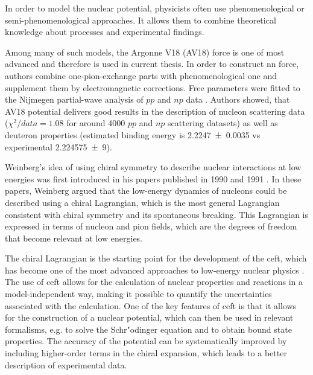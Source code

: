 In order to model the nuclear potential, physicists often use phenomenological
or semi-phenomenological approaches. It allows them to combine
theoretical knowledge about processes and experimental findings.

Among many of such models, the Argonne V18 (AV18) \cite{AV18Wiringa} force is one of most
advanced and therefore is used in current thesis.
In order to construct \gls{nn} force, authors combine
one-pion-exchange parts
with phenomenological one and supplement them by electromagnetic corrections.
Free parameters were fitted to
the Nijmegen partial-wave analysis of $pp$ and $np$ data \cite{NijmegenPhysRevC.48.792}. 
Authors showed, that AV18 potential delivers good results
in the description of nucleon scattering data ($\chi ^2/data = 1.08$ for around \num{4000} $pp$ and $np$ scattering datasets) 
as well as deuteron properties (estimated binding energy is \SI{2.2247(35)}{\mev} vs experimental \SI{ 2.224 575(9)}{\mev}).

Weinberg's idea of using chiral symmetry to describe nuclear interactions at low
energies was first introduced in his papers published in 1990 and 1991 \cite{WEINBERG1990,WEINBERG1991}.
In these papers, Weinberg argued that the low-energy dynamics of nucleons
could be described using a chiral Lagrangian, which is the most general
Lagrangian consistent with chiral symmetry and its spontaneous breaking.
This Lagrangian is expressed in terms of nucleon and pion fields,
which are the degrees of freedom that become relevant at low energies.

The chiral Lagrangian is the starting point for the development of
the \gls{ceft}, which has become one of the
most advanced approaches to low-energy nuclear physics \cite{EpelHam2008}.
The use of \gls{ceft} allows for the calculation of nuclear properties
and reactions in a model-independent way, making it possible to
quantify the uncertainties associated with the calculation. One of the
key features of \gls{ceft} is that it allows for the construction of
a nuclear potential, which can then be used in relevant formalisms, e.g. to solve the Schr"odinger
equation and to obtain bound state properties. The accuracy of the
potential can be systematically improved by including higher-order
terms in the chiral expansion, which leads to a better description of
experimental data.

 
